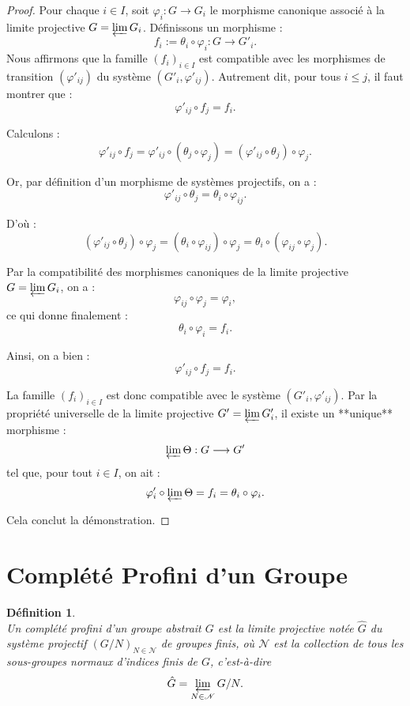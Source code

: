 \documentclass[a4paper, 14pt]{report}
\newtheorem{definition}{Définition}[section]
\begin{document}
\begin{onehalfspace}
{\begin{proof}
	Pour chaque $i \in I$, soit $\varphi_i : G \to G_i$ le morphisme canonique associé à la limite projective $G = \varprojlim G_i$. Définissons un morphisme :
	\[
	f_i := \theta_i \circ \varphi_i : G \longrightarrow G'_i.
	\]
	Nous affirmons que la famille $(f_i)_{i \in I}$ est compatible avec les morphismes de transition $(\varphi'_{ij})$ du système $(G'_i, \varphi'_{ij})$. Autrement dit, pour tous $i \leq j$, il faut montrer que :
	\[
	\varphi'_{ij} \circ f_j = f_i.
	\]
	
	Calculons :
	\[
	\varphi'_{ij} \circ f_j = \varphi'_{ij} \circ (\theta_j \circ \varphi_j) = (\varphi'_{ij} \circ \theta_j) \circ \varphi_j.
	\]
	
	Or, par définition d’un morphisme de systèmes projectifs, on a :
	\[
	\varphi'_{ij} \circ \theta_j = \theta_i \circ \varphi_{ij}.
	\]
	
	D’où :
	\[
	(\varphi'_{ij} \circ \theta_j) \circ \varphi_j = (\theta_i \circ \varphi_{ij}) \circ \varphi_j = \theta_i \circ (\varphi_{ij} \circ \varphi_j).
	\]
	
	Par la compatibilité des morphismes canoniques de la limite projective $G = \varprojlim G_i$, on a :
	\[
	\varphi_{ij} \circ \varphi_j = \varphi_i,
	\]
	ce qui donne finalement :
	\[
	\theta_i \circ \varphi_i = f_i.
	\]
	
	Ainsi, on a bien :
	\[
	\varphi'_{ij} \circ f_j = f_i.
	\]
	
	La famille $(f_i)_{i \in I}$ est donc compatible avec le système $(G'_i, \varphi'_{ij})$. Par la propriété universelle de la limite projective $G' = \varprojlim G'_i$, il existe un **unique** morphisme :
	\[
	\varprojlim \Theta : G \longrightarrow G'
	\]
	tel que, pour tout $i \in I$, on ait :
	\[
	\varphi'_i \circ \varprojlim \Theta = f_i = \theta_i \circ \varphi_i.
	\]
	
	Cela conclut la démonstration.
\end{proof}




\section{Complété Profini d'un Groupe }

\begin{definition} \cite{herfort2012profinite}\\
Un complété profini d’un groupe abstrait \( G \) est la limite projective notée $\widehat{G}$ du système projectif \( (G/N)_{N \in \mathscr{N}} \) de groupes finis, où \( \mathscr{N} \) est la collection de tous les sous-groupes normaux d’indices finis de \( G \), c’est-à-dire
	\[
	\hat{G} = \varprojlim_{N \in \mathscr{N}} G/N.
	\]
\end{definition}

}
\end{onehalfspace}
\end{document}
